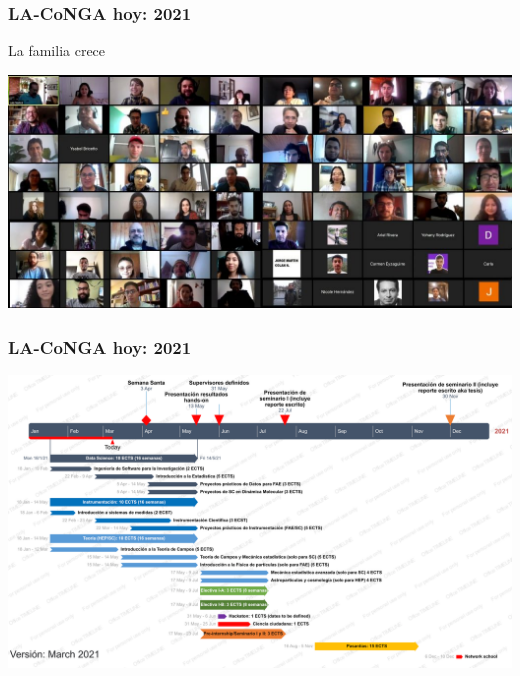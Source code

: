 \begin{frame}[fragile]
\frametitle{LA-CoNGA hoy: 2021}
La familia crece
\begin{center}
\includegraphics[scale=0.41]{imagenes/bienvenida-cohorte1-2.jpg}
\end{center}
\end{frame}

\begin{frame}[fragile]
\frametitle{LA-CoNGA hoy: 2021}
\begin{center}
\includegraphics[scale=0.09]{imagenes/202103_GANTT_LA-CoNGA.png}
\end{center}
\end{frame}


